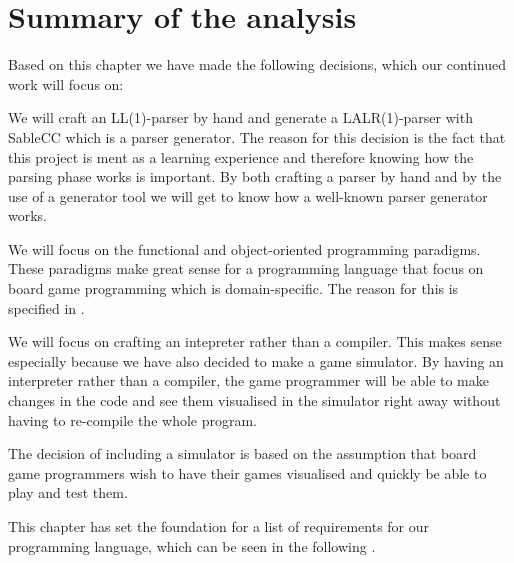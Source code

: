 \section{Summary of the analysis}
\label{sec:summaryofdecisions}

Based on this chapter we have made the following decisions, which our
continued work will focus on:

We will craft an LL(1)-parser by hand and generate a LALR(1)-parser with SableCC
which is a parser generator. The reason for this decision is the fact that this
project is ment as a learning experience and therefore knowing how the parsing
phase works is important. By both crafting a parser by hand and by the use of a
generator tool we will get to know how a well-known parser generator works.

We will focus on the functional and object-oriented programming
paradigms. These paradigms make great sense for a programming language that
focus on board game programming which is domain-specific. The reason for this 
is specified in .

We will focus on crafting an intepreter rather than a compiler. This
makes sense especially because we have also decided to make a game simulator.
By having an interpreter rather than a compiler, the game programmer will be
able to make changes in the code and see them visualised in the simulator right
away without having to re-compile the whole program.

The decision of including a simulator is based on the assumption that board game
programmers wish to have their games visualised and quickly be able to play and
test them.

This chapter has set the foundation for a list of requirements for
our programming language, which can be seen in the following
.
